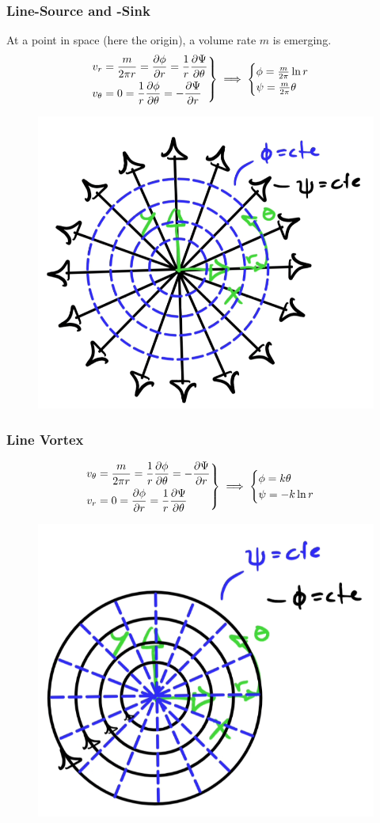 \subsubsection{Line-Source and -Sink}
At a point in space (here the origin), a volume rate $m$ is emerging. 
\begin{equation*}
	\left.\begin{split}
		v_r&= \frac{m}{2\pi r} =  \frac{\partial \phi}{\partial r} = \frac 1r \frac{\partial \Psi}{\partial \theta}\\
		v_\theta &= 0 = \frac 1r \frac{\partial \phi}{\partial \theta} = -\frac{\partial \Psi}{\partial r}
	\end{split}\right\}\implies \begin{cases}
	\phi =\frac{m}{2\pi}\ln r \\
	\psi = \frac{m}{2\pi}\theta
	\end{cases}\hfill
\end{equation*}
\begin{figure}[H]
	\centering
	\includegraphics[width=0.4\linewidth]{Sketches/source_sink_flow}
	\caption{}
	\label{fig:sourcesinkflow}
\end{figure}


\subsubsection{Line Vortex}
\begin{equation*}
	\left.\begin{split}
		v_\theta&= \frac{m}{2\pi r} =  \frac 1r \frac{\partial \phi}{\partial \theta} = -\frac{\partial \Psi}{\partial r}\\
		v_r &= 0 = \frac{\partial \phi}{\partial r} = \frac 1r \frac{\partial \Psi}{\partial \theta}
	\end{split}\right\}\implies \begin{cases}
		\phi =k\theta \\
		\psi = -k\ln r
	\end{cases}\hfill
\end{equation*}
\begin{figure}[H]
	\centering
	\includegraphics[width=0.4\linewidth]{Sketches/line_vortex_flow}
	\caption{}
	\label{fig:linevortexflow}
\end{figure}

